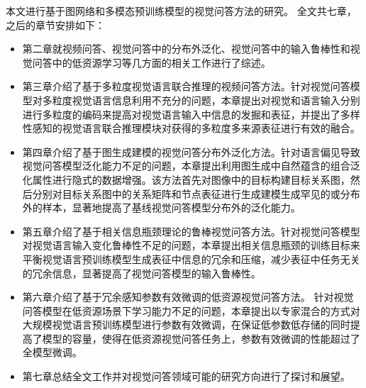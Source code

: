 

本文进行基于图网络和多模态预训练模型的视觉问答方法的研究。
全文共七章，之后的章节安排如下： 
\begin{itemize}[wide,leftmargin=0pt,itemsep=1pt]    
\item 第二章就视频问答、视觉问答中的分布外泛化、视觉问答中的输入鲁棒性和视觉问答中的低资源学习等几方面的相关工作进行了综述。

\item 第三章介绍了基于多粒度视觉语言联合推理的视频问答方法。针对视觉问答模型对多粒度视觉语言信息利用不充分的问题，本章提出对视觉和语言输入分别进行多粒度的编码来提高对视觉语言输入中信息的发掘和表征，并提出了多样性感知的视觉语言联合推理模块对获得的多粒度多来源表征进行有效的融合。

\item 第四章介绍了基于图生成建模的视觉问答分布外泛化方法。针对语言偏见导致视觉问答模型泛化能力不足的问题，本章提出利用图生成中自然蕴含的组合泛化属性进行隐式的数据增强。该方法首先对图像中的目标构建目标关系图，然后分别对目标关系图中的关系矩阵和节点表征进行生成建模生成罕见的或分布外的样本，显著地提高了基线视觉问答模型分布外的泛化能力。

\item 第五章介绍了基于相关信息瓶颈理论的鲁棒视觉问答方法。针对视觉问答模型对视觉语言输入变化鲁棒性不足的问题，本章提出相关信息瓶颈的训练目标来平衡视觉语言预训练模型生成表征中信息的冗余和压缩，减少表征中任务无关的冗余信息，显著提高了视觉问答模型的输入鲁棒性。

\item 第六章介绍了基于冗余感知参数有效微调的低资源视觉问答方法。
针对视觉问答模型在低资源场景下学习能力不足的问题，本章提出以专家混合的方式对大规模视觉语言预训练模型进行参数有效微调，在保证低参数低存储的同时提高了模型的容量，使得在低资源视觉问答任务上，参数有效微调的性能超过了全模型微调。

\item 第七章总结全文工作并对视觉问答领域可能的研究方向进行了探讨和展望。
\end{itemize}


